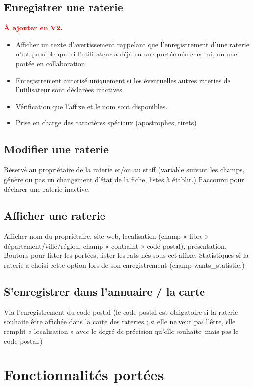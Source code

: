 ﻿\documentclass[a4paper,10pt]{article}
\newcommand\desire[1]{\noindent\textbf{\textcolor{red}{#1}}}
\begin{document}
\subsection{Enregistrer une raterie}

\desire{\`A ajouter en V2.} 
\begin{itemize}
\item Afficher un texte d'avertissement rappelant que l'enregistrement d'une raterie n'est possible que si l'utilisateur a déjà eu une portée née chez lui, ou une portée en collaboration.
\item Enregistrement autorisé uniquement si les éventuelles autres rateries de l'utilisateur sont déclarées inactives.
\item Vérification que l'affixe et le nom sont disponibles. 
\item Prise en charge des caractères spéciaux (apostrophes, tirets)
\end{itemize}

\subsection{Modifier une raterie}
Réservé au propriétaire de la raterie et/ou au staff (variable suivant les champs, génère ou pas un changement d'état de la fiche, listes à établir.) Raccourci pour déclarer une raterie inactive.

\subsection{Afficher une raterie}
Afficher nom du propriétaire, site web, localisation (champ « libre » département/ville/région, champ « contraint » code postal), présentation. Boutons pour lister les portées, lister les rats nés sous cet affixe. Statistiques si la raterie a choisi cette option lors de son enregistrement (champ wants\_statistic.)
\subsection{S'enregistrer dans l'annuaire / la carte}
Via l'enregistrement du code postal (le code postal est obligatoire si la raterie souhaite être affichée dans la carte des rateries ; si elle ne veut pas l'être, elle remplit « localisation » avec le degré de précision qu'elle souhaite, mais pas le code postal.)   

\section{Fonctionnalités portées}
\end{document}
